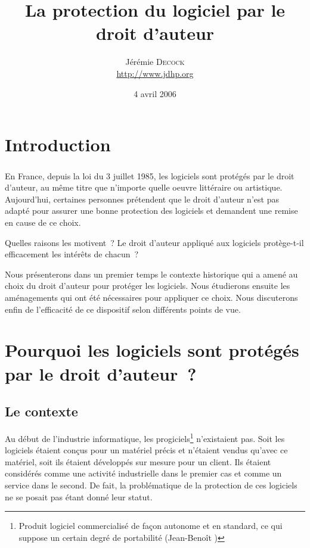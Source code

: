 \documentclass{report}
\title{La protection du logiciel par le droit d'auteur}
\author{Jérémie \textsc{Decock} \\ \url{http://www.jdhp.org}}
\date{4 avril 2006}
\begin{document}
\maketitle

\chapter*{Introduction}
\paragraph{}
En France, depuis la loi du 3 juillet 1985, les logiciels sont protégés par le droit d'auteur, au même titre que n'importe quelle oeuvre littéraire ou artistique. Aujourd'hui, certaines personnes prétendent que le droit d'auteur n'est pas adapté pour assurer une bonne protection des logiciels et demandent une remise en cause de ce choix.

Quelles raisons les motivent~? Le droit d'auteur appliqué aux logiciels protège-t-il efficacement les intérêts de chacun~?

Nous présenterons dans un premier temps le contexte historique qui a amené au choix du droit d'auteur pour protéger les logiciels. Nous étudierons ensuite les aménagements qui ont été nécessaires pour appliquer ce choix. Nous discuterons enfin de l'efficacité de ce dispositif selon différents points de vue.

\tableofcontents

\chapter{Pourquoi les logiciels sont protégés par le droit d'auteur~?}

\section{Le contexte}
Au début de l'industrie informatique, les progiciels\footnote{\og Produit logiciel commercialisé de façon autonome et en standard, ce qui suppose un certain degré de portabilité \fg{} (Jean-Benoît )} n'existaient pas. Soit les logiciels étaient conçus pour un matériel précis et n'étaient vendus qu'avec ce matériel, soit ils étaient développés sur mesure pour un client. Ils étaient considérés comme une activité industrielle dans le premier cas et comme un service dans le second. De fait, la problématique de la protection de ces logiciels ne se posait pas étant donné leur statut.
\end{document}
